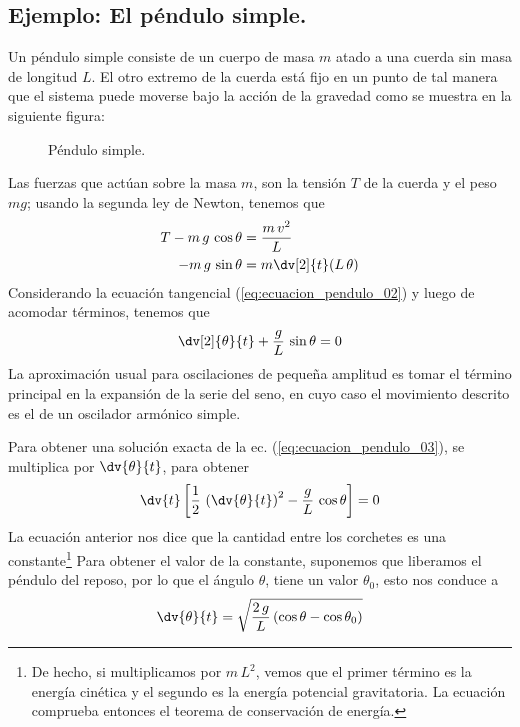 \subsection{Ejemplo: El péndulo simple.}
Un péndulo simple consiste de un cuerpo de masa $m$ atado a una cuerda sin masa de longitud $L$. El otro extremo de la cuerda está fijo en un punto de tal manera que el sistema puede moverse bajo la acción de la gravedad como se muestra en la siguiente figura:
\begin{figure}[H]
    \centering
    
    \caption{Péndulo simple.}
\end{figure}
Las fuerzas que actúan sobre la masa $m$, son la tensión $T$ de la cuerda y el peso $mg$; usando la segunda ley de Newton, tenemos que
\begin{align}
T - m \, g \, \cos \theta &= \dfrac{m \, v^{2}}{L}  \label{eq:ecuacion_pendulo_01} \\
-m \, g \, \sin \theta &= m \dv[2]{t} (L \, \theta) \label{eq:ecuacion_pendulo_02}
\end{align}
Considerando la ecuación tangencial (\ref{eq:ecuacion_pendulo_02}) y luego de acomodar términos, tenemos que
\begin{equation} \dv[2]{\theta}{t} + \dfrac{g}{L} \, \sin \theta = 0
\label{eq:ecuacion_pendulo_03}
\end{equation}
La aproximación usual para oscilaciones de pequeña amplitud es tomar el término principal en la expansión de la serie del seno, en cuyo caso el movimiento descrito es el de un oscilador armónico simple.
\par
Para obtener una solución exacta de la ec. (\ref{eq:ecuacion_pendulo_03}), se multiplica por $\displaystyle{\dv{\theta}{t}}$, para obtener
\begin{equation}
\dv{t} \left[ \dfrac{1}{2} \, \left( \dv{\theta}{t} \right)^{2} - \dfrac{g}{L} \, \cos \theta \right] = 0
\label{eq:ecuacion_pendulo_04}
\end{equation}
La ecuación anterior nos dice que la cantidad entre los corchetes es una constante\footnote{De hecho, si multiplicamos por $m \, L^{2}$, vemos que el primer término es la energía cinética y el segundo es la energía potencial gravitatoria. La ecuación comprueba entonces el teorema de conservación de energía.} Para obtener el valor de la constante, suponemos que liberamos el péndulo del reposo, por lo que el ángulo $\theta$, tiene un valor $\theta_{0}$, esto nos conduce a
\[ \dv{\theta}{t} = \sqrt{\dfrac{2 \, g}{L} \, (\cos \theta - \cos \theta_{0})}
\]
